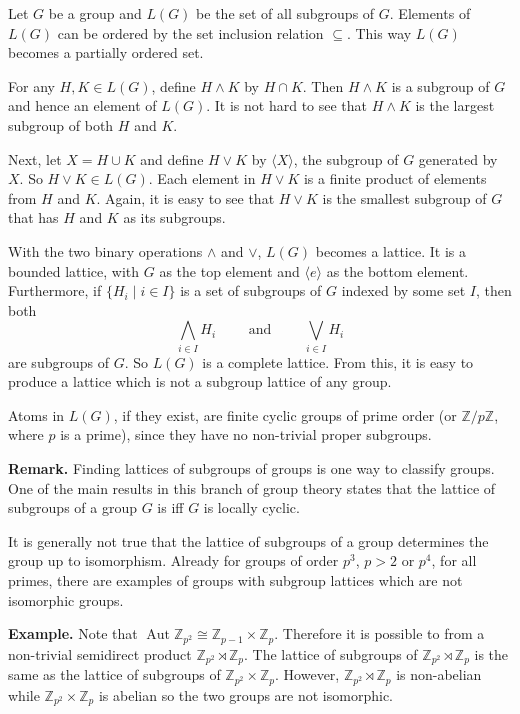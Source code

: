 \documentclass[12pt]{article}
\DeclareMathOperator{\Aut}{Aut }
\begin{document}
Let $G$ be a group and $L(G)$ be the set of all subgroups of $G$.  Elements of $L(G)$ can be ordered by the set inclusion relation $\subseteq$.  This way $L(G)$ becomes a partially ordered set.

For any $H,K\in L(G)$, define $H\wedge K$ by $H\cap K$.  Then $H\wedge K$ is a subgroup of $G$ and hence an element of $L(G)$.  It is not hard to see that $H \wedge K$ is the largest subgroup of both $H$ and $K$.

Next, let $X=H\cup K$ and define $H\vee K$ by $\langle X\rangle$, the subgroup of $G$ generated by $X$.  So $H\vee K\in L(G)$.  Each element in $H\vee K$ is a finite product of elements from $H$ and $K$.  Again, it is easy to see that $H \vee K$ is the smallest subgroup of $G$ that has $H$ and $K$ as its subgroups.

With the two binary operations $\wedge$ and $\vee$, $L(G)$ becomes a lattice.  It is a bounded lattice, with $G$ as the top element and $\langle e \rangle$ as the bottom element.  Furthermore, if $\lbrace H_i \mid i\in I\rbrace$ is a set of subgroups of $G$ indexed by some set $I$, then both 
$$\bigwedge_{i\in I} H_i\qquad\mbox{ and }\qquad\bigvee_{i\in I} H_i$$
are subgroups of $G$.  So $L(G)$ is a complete lattice.  From this, it is easy to produce a lattice which is not a subgroup lattice of any group.

Atoms in $L(G)$, if they exist, are finite cyclic groups of prime order (or $\mathbb{Z}/p\mathbb{Z}$, where $p$ is a prime), since they have no non-trivial proper subgroups.

\textbf{Remark.}  Finding lattices of subgroups of groups is one way to classify groups.  One of the main results in this branch of group theory states that the lattice of subgroups of a group $G$ is  iff $G$ is locally cyclic.

It is generally not true that the lattice of subgroups of a group determines the group up to isomorphism.  Already for groups of order $p^3$, $p>2$ or $p^4$, for all primes, there are examples of groups with  subgroup lattices which are not isomorphic groups.

\textbf{Example.}  Note that $\Aut \mathbb{Z}_{p^2}\cong \mathbb{Z}_{p-1}\times \mathbb{Z}_p$.  Therefore it is possible to from a non-trivial semidirect product $\mathbb{Z}_{p^2}\rtimes \mathbb{Z}_p$.  The lattice of subgroups of $\mathbb{Z}_{p^2}\rtimes \mathbb{Z}_p$ is the same as the lattice of subgroups of $\mathbb{Z}_{p^2} \times \mathbb{Z}_p$.  However, $\mathbb{Z}_{p^2}\rtimes \mathbb{Z}_p$ is non-abelian while $\mathbb{Z}_{p^2}\times \mathbb{Z}_p$ is abelian so the two groups are not isomorphic. 
\end{document}
